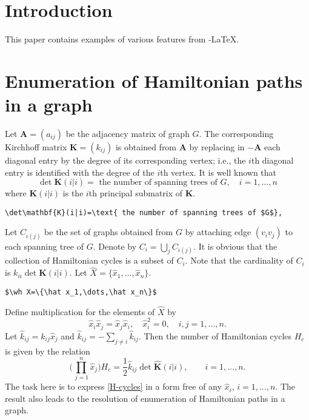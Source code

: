 \documentclass[mlq,fleqn]{w-art}
\newcommand{\wh}{\widehat}
\begin{document}




\section{Introduction}

This paper contains examples of various features from \AmS-\LaTeX{}.

\section{Enumeration of Hamiltonian paths in a graph}

Let $\mathbf{A}=(a_{ij})$ be the adjacency matrix of graph $G$. The
corresponding Kirchhoff matrix $\mathbf{K}=(k_{ij})$ is obtained from
$\mathbf{A}$ by replacing in $-\mathbf{A}$ each diagonal entry by the
degree of its corresponding vertex; i.e., the $i$th diagonal entry is
identified with the degree of the $i$th vertex. It is well known that
\begin{equation}
\det\mathbf{K}(i|i)=\text{ the number of spanning trees of $G$},
\quad i=1,\dots,n
\end{equation}
where $\mathbf{K}(i|i)$ is the $i$th principal submatrix of
$\mathbf{K}$.
\begin{verbatim}
\det\mathbf{K}(i|i)=\text{ the number of spanning trees of $G$},
\end{verbatim}

Let $C_{i(j)}$ be the set of graphs obtained from $G$ by attaching edge
$(v_iv_j)$ to each spanning tree of $G$. Denote by $C_i=\bigcup_j
C_{i(j)}$. It is obvious that the collection of Hamiltonian cycles is a
subset of $C_i$. Note that the cardinality of $C_i$ is $k_{ii}\det
\mathbf{K}(i|i)$. Let $\wh X=\{\hat x_1,\dots,\hat x_n\}$.
\begin{verbatim}
$\wh X=\{\hat x_1,\dots,\hat x_n\}$
\end{verbatim}
Define multiplication for the elements of $\wh X$ by
\begin{equation}\label{multdef}
\hat x_i\hat x_j=\hat x_j\hat x_i,\quad \hat x^2_i=0,\quad
i,j=1,\dots,n.
\end{equation}
Let $\hat k_{ij}=k_{ij}\hat x_j$ and $\hat k_{ij}=-\sum_{j\not=i} \hat
k_{ij}$. Then the number of Hamiltonian cycles $H_c$ is given by the
relation \cite{liuchow:formalsum}
\begin{equation}\label{H-cycles}
\biggl(\prod^n_{\,j=1}\hat x_j\biggr)H_c=\frac{1}{2}\hat k_{ij}\det
\wh{\mathbf{K}}(i|i),\qquad i=1,\dots,n.
\end{equation}
The task here is to express \eqref{H-cycles}
in a form free of any $\hat x_i$,
$i=1,\dots,n$. The result also leads to the resolution of enumeration of
Hamiltonian paths in a graph.
\end{document}
